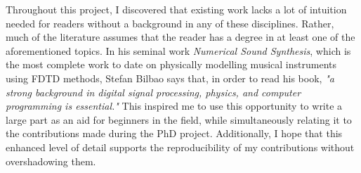 Throughout this project, I discovered that existing work lacks a lot of intuition needed for readers without a background in any of these disciplines. Rather, much of the literature assumes that the reader has a degree in at least one of the aforementioned topics. In his seminal work \textit{Numerical Sound Synthesis}, which is the most complete work to date on physically modelling musical instruments using FDTD methods, Stefan Bilbao says that, in order to read his book, \textit{"a strong background in digital signal processing, physics, and computer programming is essential."} This inspired me to use this opportunity to write a large part as an aid for beginners in the field, while simultaneously relating it to the contributions made during the PhD project. Additionally, I hope that this enhanced level of detail supports the reproducibility of my contributions without overshadowing them.













